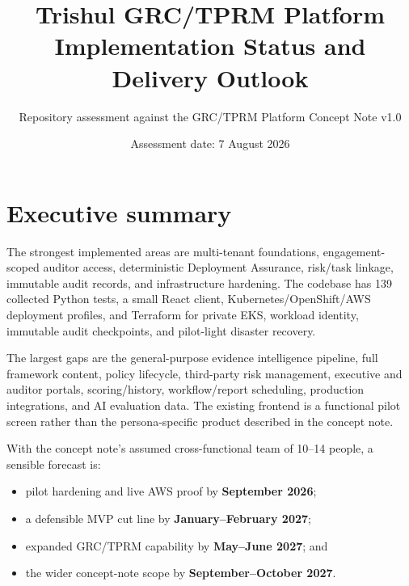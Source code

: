 \documentclass[11pt,a4paper]{article}
\title{\textbf{Trishul GRC/TPRM Platform}\\Implementation Status and Delivery Outlook}
\author{Repository assessment against the GRC/TPRM Platform Concept Note v1.0}
\date{Assessment date: 7 August 2026}
\begin{document}
\maketitle

\begin{center}
\end{center}

\tableofcontents
\newpage

\section{Executive summary}

The strongest implemented areas are multi-tenant foundations, engagement-scoped
auditor access, deterministic Deployment Assurance, risk/task linkage, immutable
audit records, and infrastructure hardening. The codebase has 139 collected Python
tests, a small React client, Kubernetes/OpenShift/AWS deployment profiles, and
Terraform for private EKS, workload identity, immutable audit checkpoints, and
pilot-light disaster recovery.

The largest gaps are the general-purpose evidence intelligence pipeline, full
framework content, policy lifecycle, third-party risk management, executive and
auditor portals, scoring/history, workflow/report scheduling, production
integrations, and AI evaluation data. The existing frontend is a functional pilot
screen rather than the persona-specific product described in the concept note.

With the concept note's assumed cross-functional team of 10--14 people, a sensible
forecast is:

\begin{itemize}
  \item pilot hardening and live AWS proof by \textbf{September 2026};
  \item a defensible MVP cut line by \textbf{January--February 2027};
  \item expanded GRC/TPRM capability by \textbf{May--June 2027}; and
  \item the wider concept-note scope by \textbf{September--October 2027}.
\end{itemize}
\end{document}
